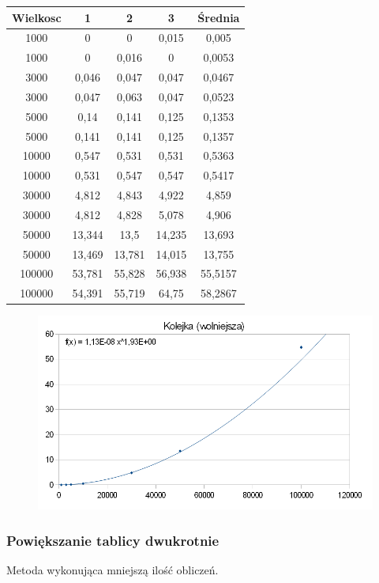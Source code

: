 \documentclass[12pt,a4paper,titlepage]{article}
\begin{document}
\begin{center}
\begin {tabular}{|c|c|c|c|c|}\hline
Wielkosc & 1 & 2 & 3 & Średnia \\\hline
1000 &	0	&	0	 &	0,015 &	0,005 \\\hline 
1000 &	0	&	0,016 &	0	 &	0,0053 \\\hline 
3000 &	0,046 &	0,047 &	0,047 &	0,0467 \\\hline 
3000 &	0,047 &	0,063 &	0,047 &	0,0523 \\\hline 
5000 &	0,14 &	0,141 &	0,125 &	0,1353 \\\hline 
5000 &	0,141 &	0,141 &	0,125 &	0,1357 \\\hline 
10000 &	0,547 &	0,531 &	0,531 &	0,5363 \\\hline 
10000 &	0,531 &	0,547 &	0,547 &	0,5417 \\\hline 
30000 &	4,812 &	4,843 &	4,922 &	4,859 \\\hline 
30000 &	4,812 &	4,828 &	5,078 &	4,906 \\\hline 
50000 &	13,344 &	13,5 &	14,235 &	13,693 \\\hline 
50000 &	13,469 &	13,781 &	14,015 &	13,755 \\\hline 
100000 &	53,781 &	55,828 &	56,938 &	55,5157 \\\hline 
100000 &	54,391 &	55,719 &	64,75 &	58,2867 \\\hline
\end{tabular}
\end {center}
\begin{figure}[h]
\begin{center}
\includegraphics[scale=0.5]{kolejka_1.png}
\end{center}
\end{figure}

\newpage
\subsubsection{Powiększanie tablicy dwukrotnie}
Metoda wykonująca mniejszą ilość obliczeń.
\end{document}
